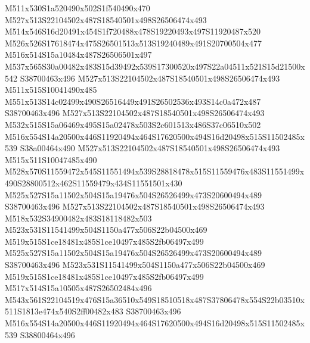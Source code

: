 \documentclass{article}
\begin{document}
\begin{multicols}{2}
M511x530S1a520490x502S1f540490x470 M527x513S22104502x487S18540501x498S26506474x493 M514x546S16d20491x454S1f720488x478S19220493x497S11920487x520 M526x526S17618474x475S26501513x513S19240489x491S20700504x477 M516x514S15a10484x487S26506501x497 M537x565S30a00482x483S15d39492x539S17300520x497S22a04511x521S15d21500x542 S38700463x496 M527x513S22104502x487S18540501x498S26506474x493 M511x515S10041490x485 M551x513S14c02499x490S26516449x491S26502536x493S14c0a472x487 S38700463x496 M527x513S22104502x487S18540501x498S26506474x493 M532x515S15a06469x495S15a02478x503S2c601513x486S37c06510x502 M516x554S14a20500x446S11920494x464S17620500x494S16d20498x515S11502485x539 S38a00464x490 M527x513S22104502x487S18540501x498S26506474x493 M515x511S10047485x490 M528x570S11559472x545S11551494x539S28818478x515S11559476x483S11551499x490S28800512x462S11559479x434S11551501x430 M525x527S15a11502x504S15a19476x504S26526499x473S20600494x489 S38700463x496 M527x513S22104502x487S18540501x498S26506474x493 M518x532S34900482x483S18118482x503 M523x531S11541499x504S1150a477x506S22b04500x469 M519x515S1ce18481x485S1ce10497x485S2fb06497x499 M525x527S15a11502x504S15a19476x504S26526499x473S20600494x489 S38700463x496 M523x531S11541499x504S1150a477x506S22b04500x469 M519x515S1ce18481x485S1ce10497x485S2fb06497x499 M517x514S15a10505x487S26502484x496 M543x561S22104519x476S15a36510x549S18510518x487S37806478x554S22b03510x511S1813e474x540S2ff00482x483 S38700463x496 M516x554S14a20500x446S11920494x464S17620500x494S16d20498x515S11502485x539 S38800464x496


\end{multicols}
\end{document}
